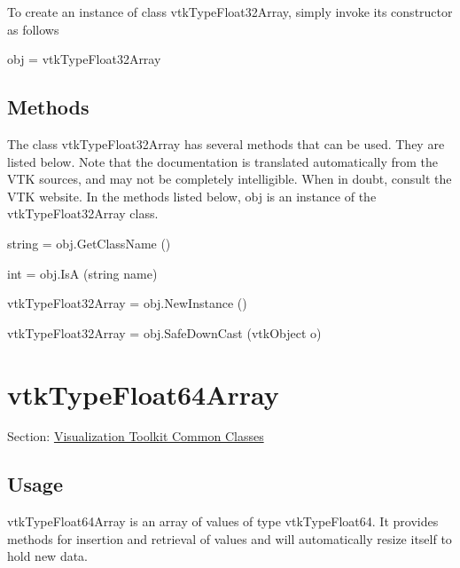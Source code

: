 To create an instance of class vtk\-Type\-Float32\-Array, simply invoke its constructor as follows \begin{DoxyVerb}  obj = vtkTypeFloat32Array
\end{DoxyVerb}
 \hypertarget{vtkwidgets_vtkxyplotwidget_Methods}{}\subsection{Methods}\label{vtkwidgets_vtkxyplotwidget_Methods}
The class vtk\-Type\-Float32\-Array has several methods that can be used. They are listed below. Note that the documentation is translated automatically from the V\-T\-K sources, and may not be completely intelligible. When in doubt, consult the V\-T\-K website. In the methods listed below, {\ttfamily obj} is an instance of the vtk\-Type\-Float32\-Array class. 
\begin{DoxyItemize}
\item {\ttfamily string = obj.\-Get\-Class\-Name ()}  
\item {\ttfamily int = obj.\-Is\-A (string name)}  
\item {\ttfamily vtk\-Type\-Float32\-Array = obj.\-New\-Instance ()}  
\item {\ttfamily vtk\-Type\-Float32\-Array = obj.\-Safe\-Down\-Cast (vtk\-Object o)}  
\end{DoxyItemize}\hypertarget{vtkcommon_vtktypefloat64array}{}\section{vtk\-Type\-Float64\-Array}\label{vtkcommon_vtktypefloat64array}
Section\-: \hyperlink{sec_vtkcommon}{Visualization Toolkit Common Classes} \hypertarget{vtkwidgets_vtkxyplotwidget_Usage}{}\subsection{Usage}\label{vtkwidgets_vtkxyplotwidget_Usage}
vtk\-Type\-Float64\-Array is an array of values of type vtk\-Type\-Float64. It provides methods for insertion and retrieval of values and will automatically resize itself to hold new data.

